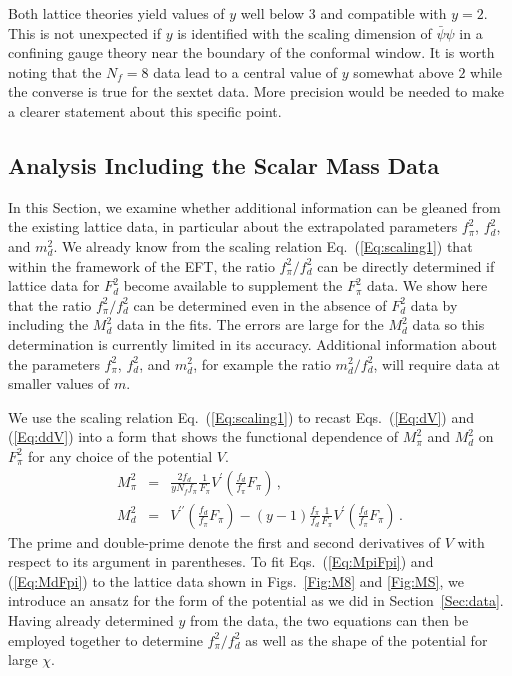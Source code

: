 \documentclass[a4paper,11pt]{article}
\newcommand{\beqs}{\begin{eqnarray}}
\newcommand{\eeqs}{\end{eqnarray}}
\begin{document}
Both lattice theories yield values of $y$ well below $3$ and compatible with $y=2$. This is not unexpected if $y$ is identified with the scaling dimension of $\bar{\psi}\psi$ in a confining gauge theory near the boundary of the conformal window. It is worth noting that the $N_f=8$ data lead to a central value of $y$ somewhat above $2$ while the converse is true for the sextet data. More precision would be needed to make a clearer statement about this specific point.
 

\subsection{Analysis Including the Scalar Mass Data}
\label{Sec:potential}


In this Section, we examine whether additional information can be gleaned from the existing lattice data, in particular about the extrapolated parameters $f_{\pi}^2$, $f_d^2$, and $m_d^2$. We already know from the scaling relation Eq.~(\ref{Eq:scaling1}) that within the framework of the EFT, the ratio $f_{\pi}^2/f_d^2$  can be directly determined if lattice data for $F_d^2$ become available to supplement the $F_{\pi}^2$ data. 
We show here that the ratio $f_{\pi}^2/f_d^2$ can be determined even in the absence of $F_d^2$ data by including the $M_d^2$ data in the fits. The errors are large for the $M_d^2$ data so this determination is currently limited in its accuracy.  Additional information about the parameters $f_{\pi}^2$, $f_d^2$, and $m_d^2$, for example the ratio $m_d^2/f_d^2$, will require data at smaller values of $m$.

We use the scaling relation Eq.~(\ref{Eq:scaling1}) to recast Eqs.~(\ref{Eq:dV}) and (\ref{Eq:ddV}) into a form that shows the functional dependence of $M^2_\pi$ and $M^2_d$ on $F^2_\pi$ for any choice of the potential $V$.
\beqs
\label{Eq:MpiFpi}
M_{\pi}^2 & = & \frac{2f_d}{y N_{f} f_{\pi}} \frac{1}{F_\pi} V^{\prime}\left(\frac{f_d}{f_\pi}F_\pi\right)\, ,\\
M_{d}^2 & = & V^{\prime \prime}\left(\frac{f_{d}}{f_{\pi}}F_\pi\right)  - (y-1) \frac{f_\pi}{f_d}\frac{1}{F_\pi}     V^{\prime}\left(\frac{f_{d}}{f_{\pi}}F_\pi\right)\, .
\label{Eq:MdFpi}
\eeqs 
The prime and double-prime denote the first and second derivatives of $V$ with respect to its argument in parentheses. To fit Eqs.~(\ref{Eq:MpiFpi}) and (\ref{Eq:MdFpi}) to the lattice data shown in Figs.~\ref{Fig:M8} and \ref{Fig:MS}, we introduce an ansatz for the form of the potential as we did in Section~\ref{Sec:data}. Having already determined $y$ from the data, the two equations can then be employed together to determine $f^2_\pi/f^2_d$ as well as the shape of the potential for large $\chi$.
\end{document}
